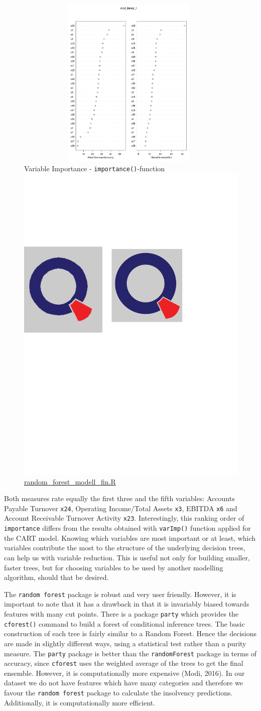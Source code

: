 \documentclass{article}
\newcommand{\bscaption}[2]{\protect\includegraphics[scale=0.05]{qletlogo.pdf} {\href{#1}{#2}}}
\begin{document}
\begin{figure}[H]
\begin{center}
\caption{Variable Importance - \texttt{importance()}-function \bscaption{https://github.com/thsis/SPL_WS1718/blob/master/Random_Forest/random_forest_modell_fin.R}{random\_forest\_modell\_fin.R}}
\includegraphics[scale=1, height=8.3cm, width=11cm]{../Random_Forest/Rplot.pdf}
\end{center}
\end{figure}

Both measures rate equally the first three and the fifth variables: Accounts Payable Turnover \texttt{x24}, Operating Income/Total Assets \texttt{x3}, EBITDA \texttt{x6} and Account Receivable Turnover Activity \texttt{x23}. Interestingly, this ranking order of \texttt{importance} differs from the results obtained with \texttt{varImp()} function applied for the CART model. Knowing which variables are most important or at least, which variables contribute the most to the structure of the underlying decision trees, can help us with variable reduction. This is useful not only for building smaller, faster trees, but for choosing variables to be used by another modelling algorithm, should that be desired.

The \texttt{random forest} package is robust and very user friendly. However, it is important to note that it has a drawback in that it is invariably biased towards features with many cut points. There is a package \texttt{party} which provides the \texttt{cforest()} command to build a forest of conditional inference trees. The basic construction of each tree is fairly similar to a Random Forest. Hence the decisions are made in slightly different ways, using a statistical test rather than a purity measure. The \texttt{party} package is better than the \texttt{randomForest} package in terms of accuracy, since \texttt{cforest} uses the weighted average of the trees to get the final ensemble. However, it is computationally more expensive (Modi, 2016). In our dataset we do not have features which have many categories and therefore we favour the \texttt{random forest} package to calculate the insolvency predictions. Additionally, it is computationally more efficient.
\end{document}
